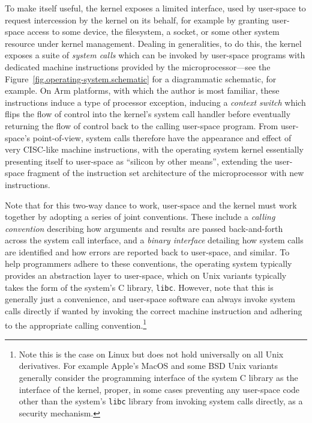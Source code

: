 \documentclass[a4paper, UKenglish, cleveref, autoref, thm-restate]{lipics-v2021}
\begin{document}
To make itself useful, the kernel exposes a limited interface, used by user-space to request intercession by the kernel on its behalf, for example by granting user-space access to some device, the filesystem, a socket, or some other system resource under kernel management.
Dealing in generalities, to do this, the kernel exposes a suite of \emph{system calls} which can be invoked by user-space programs with dedicated machine instructions provided by the microprocessor---see the Figure~\ref{fig.operating-system.schematic} for a diagrammatic schematic, for example.
On Arm platforms, with which the author is most familiar, these instructions induce a type of processor exception, inducing a \emph{context switch} which flips the flow of control into the kernel's system call handler before eventually returning the flow of control back to the calling user-space program.
From user-space's point-of-view, system calls therefore have the appearance and effect of very CISC-like machine instructions, with the operating system kernel essentially presenting itself to user-space as ``silicon by other means'', extending the user-space fragment of the instruction set architecture of the microprocessor with new instructions.

Note that for this two-way dance to work, user-space and the kernel must work together by adopting a series of joint conventions.
These include a \emph{calling convention} describing how arguments and results are passed back-and-forth across the system call interface, and a \emph{binary interface} detailing how system calls are identified and how errors are reported back to user-space, and similar.
To help programmers adhere to these conventions, the operating system typically provides an abstraction layer to user-space, which on Unix variants typically takes the form of the system's C library, \texttt{libc}.
However, note that this is generally just a convenience, and user-space software can always invoke system calls directly if wanted by invoking the correct machine instruction and adhering to the appropriate calling convention.\footnote{Note this is the case on Linux but does not hold universally on all Unix derivatives.  For example Apple's MacOS and some BSD Unix variants generally consider the programming interface of the system C library as the interface of the kernel, proper, in some cases preventing any user-space code other than the system's \texttt{libc} library from invoking system calls directly, as a security mechanism.}
\end{document}
